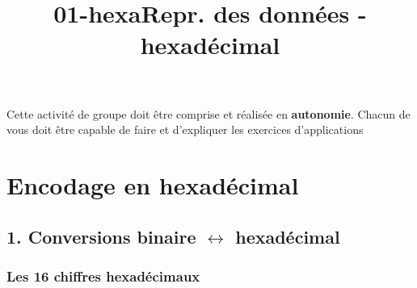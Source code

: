 \documentclass[a4paper,17pt]{extarticle}
\title{01-hexa}
\newenvironment{formule}%
{\begin{form}\color{bleuamu}}
{\end{form}}
\begin{document}
    
    \title{Repr. des données - hexadécimal}

    
    

    \begin{formule}
    Cette activité de groupe doit être comprise et réalisée en
\textbf{autonomie}. Chacun de vous doit être capable de faire et
d'expliquer les exercices d'applications

        \end{formule}
    \hypertarget{encodage-en-hexaduxe9cimal}{%
\section{Encodage en hexadécimal}\label{encodage-en-hexaduxe9cimal}}

    \hypertarget{conversions-binaire-leftrightarrow-hexaduxe9cimal}{%
\subsection{\texorpdfstring{1. Conversions binaire \(\leftrightarrow\)
hexadécimal}{1. Conversions binaire \textbackslash leftrightarrow hexadécimal}}\label{conversions-binaire-leftrightarrow-hexaduxe9cimal}}

    \hypertarget{les-16-chiffres-hexaduxe9cimaux}{%
\subsubsection{Les 16 chiffres
hexadécimaux}\label{les-16-chiffres-hexaduxe9cimaux}}
\end{document}
